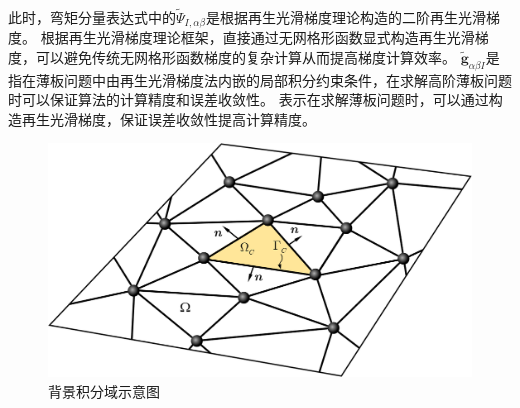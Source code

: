此时，弯矩分量表达式中的$\tilde{\Psi}_{I,\alpha\beta}$是根据再生光滑梯度理论\textsuperscript{\cite{wang2019}}构造的二阶再生光滑梯度。
根据再生光滑梯度理论框架，直接通过无网格形函数显式构造再生光滑梯度，可以避免传统无网格形函数梯度的复杂计算从而提高梯度计算效率。
$\tilde{\pmb g}_{\alpha\beta I}$是指在薄板问题中由再生光滑梯度法内嵌的局部积分约束条件，在求解高阶薄板问题时可以保证算法的计算精度和误差收敛性。
表示在求解薄板问题时，可以通过构造再生光滑梯度，保证误差收敛性提高计算精度。
\begin{figure}[H]
    \centering
    \includegraphics[scale=0.5]{figure/PHR/momentlisan.png}
    \caption{背景积分域示意图}\label{Pintegralscheme}
\end{figure}
